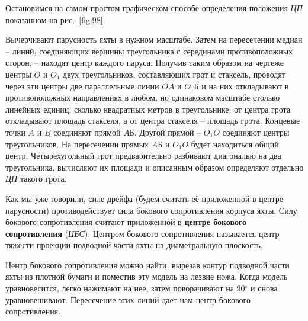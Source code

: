 \documentclass[a4paper, 12pt, twoside, final]{scrbook}
\begin{document}
Остановимся на самом простом графическом способе определения положения \textit{ЦП} показанном на рис.~\ref{fig:98}.

Вычерчивают парусность яхты в нужном масштабе. Затем на пересечении медиан \--- линий, соединяющих вершины треугольника с серединами противоположных сторон, \--- находят центр каждого паруса. Получив таким образом на чертеже центры $O$ и $O_1$ двух треугольников, составляющих грот и стаксель, проводят через эти центры две параллельные линии $OA$ и $O_1{\textit{Б}}$ и на них откладывают в противоположных направлениях в любом, но одинаковом масштабе столько линейных единиц, сколько квадратных метров в треугольнике; от центра грота откладывают площадь стакселя, а от центра стакселя \--- площадь грота. Концевые точки $A$ и $B$ соединяют прямой $A{\textit{Б}}$. Другой прямой \--- $O_1O$ соединяют центры треугольников. На пересечении прямых $A{\textit{Б}}$ и $O_1O$ будет находиться общий центр. Четырехугольный грот предварительно разбивают диагональю на два треугольника, вычисляют их площади и описанным образом определяют отдельно \textit{ЦП} такого грота.

Как мы уже говорили, силе дрейфа (будем считать её приложенной в центре парусности) противодействует сила бокового сопротивления корпуса яхты. Силу бокового сопротивления считают приложенной в \textbf{центре бокового сопротивления} (\textit{ЦБС}). Центром бокового сопротивления называется центр тяжести проекции подводной части яхты на диаметральную плоскость.

Центр бокового сопротивления можно найти, вырезав контур подводной части яхты из плотной бумаги и поместив эту модель на лезвие ножа. Когда модель уравновесится, легко нажимают на нее, затем поворачивают на 90$^\circ$ и снова уравновешивают. Пересечение этих линий дает нам центр бокового сопротивления.
\end{document}

